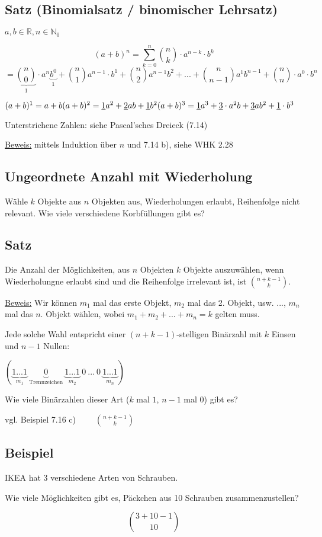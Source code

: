 \documentclass[a4paper, 12pt, twoside] {article}
\begin{document}
\subsection{Satz (Binomialsatz / binomischer Lehrsatz)} %

$a,b \in \mathbb{R}, n \in \mathbb{N}_0$

$$(a+b)^n = \sum_{k=0}^n \binom{n}{k} \cdot a^{n-k} \cdot b^k$$
$$ = \underbrace{\binom{n}{0}}_{1} \cdot a^n \underbrace{b^0}_{1} + \binom{n}{1} a^{n-1} \cdot b^1 + \binom{n}{2} a^{n-1} b^2 + ... + \binom{n}{n-1} a^1 b^{n-1} + \binom{n}{n} \cdot a^0 \cdot b^n$$

$(a+b)^1 = a + b \\
(a+b)^2 = \uline{1}a^2 + \uline{2}ab + \uline{1}b^2 \\
(a+b)^3 = \uline{1}a^3 + \uline{3} \cdot a^2b + \uline{3}ab^2 + \uline{1} \cdot b^3$

Unterstrichene Zahlen: siehe Pascal'sches Dreieck (7.14)

\underline{Beweis:} mittels Induktion über $n$ und 7.14 b), siehe WHK 2.28

\subsection{Ungeordnete Anzahl mit Wiederholung} %


Wähle $k$ Objekte aus $n$ Objekten aus, Wiederholungen erlaubt, Reihenfolge nicht relevant. Wie viele verschiedene Korbfüllungen gibt es?

\subsection{Satz} %

Die Anzahl der Möglichkeiten, aus $n$ Objekten $k$ Objekte auszuwählen, wenn Wiederholungne erlaubt sind und die Reihenfolge irrelevant ist, ist $\binom{n+k-1}{k}$.

\underline{Beweis:} Wir können $m_1$ mal das erste Objekt, $m_2$ mal das 2. Objekt, usw. ..., $m_n$ mal das $n$. Objekt wählen, wobei $m_1+m_2+...+m_n = k$ gelten muss.

Jede solche Wahl entspricht einer $(n+k-1)$-stelligen Binärzahl mit $k$ Einsen und $n-1$ Nullen:

$(\underbrace{1...1}_{m_1}\ \underbrace{0}_{\text{Trennzeichen}}\ \underbrace{1...1}_{m_2}\ 0\ ... \ 0\ \underbrace{1...1}_{m_n})$

Wie viele Binärzahlen dieser Art ($k$ mal $1$, $n-1$ mal $0$) gibt es?

vgl. Beispiel 7.16 c) $\qquad \binom{n+k-1}{k}$

\subsection[Beispiel (IKEA)]{Beispiel} %

IKEA hat 3 verschiedene Arten von Schrauben.

Wie viele Möglichkeiten gibt es, Päckchen aus 10 Schrauben zusammenzustellen?


$$\binom{3+10-1}{10}$$
\end{document}
